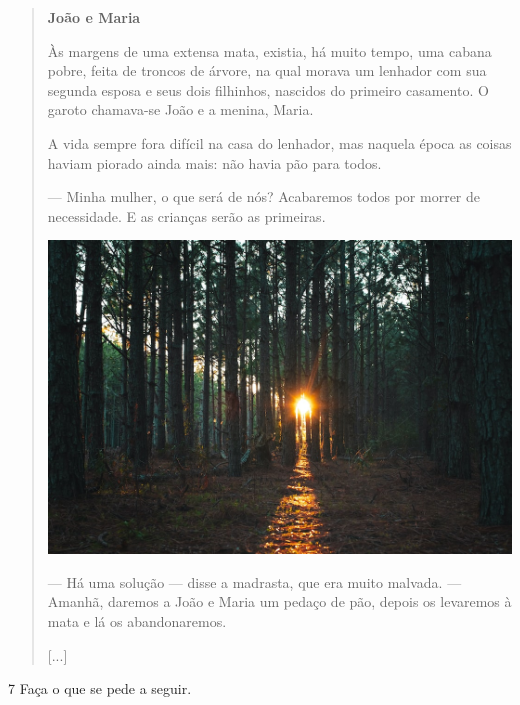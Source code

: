 \begin{quote}
\textbf{João e Maria}

Às margens de uma extensa mata, existia, há muito tempo, uma cabana
pobre, feita de troncos de árvore, na qual morava um lenhador com sua segunda esposa e
seus dois filhinhos, nascidos do primeiro casamento. O garoto chamava-se João e a
menina, Maria.

A vida sempre fora difícil na casa do lenhador, mas naquela época as
coisas haviam piorado ainda mais: não havia pão para todos.

--- Minha mulher, o que será de nós? Acabaremos todos por morrer
de necessidade. E as crianças serão as primeiras.

\noindent\includegraphics[width=\textwidth]{./media/image3.jpeg}

--- Há uma solução --- disse a madrasta, que era muito
malvada. --- Amanhã, daremos a João e Maria um pedaço de pão, depois os
levaremos à mata e lá os abandonaremos.

{[}...{]}

\end{quote}

\num{7} Faça o que se pede a seguir.

